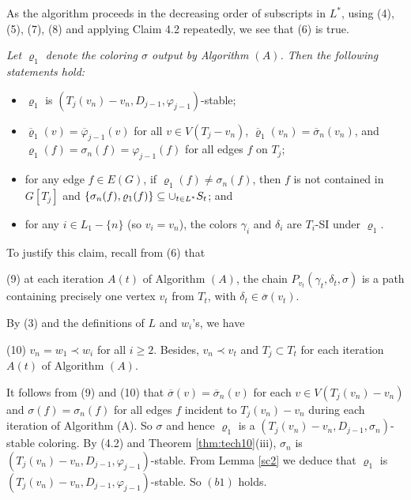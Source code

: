 \documentclass[11pt]{article}
\newcommand{\sigmabar}{\overline{\sigma}}
\newcommand{\phibar}{\overline{\varphi}}
\begin{document}
As the algorithm proceeds in the decreasing order of subscripts in $L^*$, using (4), (5), (7), (8)
and applying Claim 4.2 repeatedly, we see that (6) is true.  

\vskip 3mm
 {\em
Let $\varrho_1$ denote the coloring $\sigma$ output by Algorithm $(A)$.  Then the following statements hold:
\begin{itemize}
	\vspace{-2mm}
	\item[(b1)] $\varrho_1$ is $(T_j(v_n)-v_n,D_{j-1},\varphi_{j-1})$-stable;
	\vspace{-2mm}
	\item[(b2)] $\overline{\varrho}_1 (v)=\phibar_{j-1}(v)$ for all $v\in V(T_j-v_n)$,
	$\overline{\varrho}_1(v_n)=\sigmabar_n(v_n)$, and $\varrho_1(f)=\sigma_n(f) =\varphi_{j-1}(f)$ for all edges $f$ on $T_j$;
	\vspace{-2mm}
	\item[(b3)] for any edge $f\in E(G)$, if $\varrho_1(f)\ne \sigma_n(f)$, then $f$ is not contained in $G[T_j]$ and 
	$\{\sigma_n(f), \varrho_1(f)\} \\ \subseteq \cup_{t \in L^*} S_t$;  and
	\vspace{-2mm}
	\item[(b4)] for any $i\in L_1-\{n\}$ (so $v_i=v_n$), the colors $\gamma_i$ and $\delta_i$ are
	$T_i$-SI under $\varrho_1$. 
\end{itemize}}		

To justify this claim, recall from (6) that 

(9) at each iteration $A(t)$ of Algorithm $(A)$,  the chain $P_{v_t}(\gamma_t, \delta_t, \sigma)$ is a path 
containing precisely one vertex $v_t$ from $T_t$, with $\delta_t \in \overline{\sigma}(v_t)$. 

By (3) and the definitions of $L$ and $w_i$'s, we have

(10) $v_n =w_1 \prec w_i$ for all $i\ge 2$. Besides, $v_n\prec v_t$ and $T_j \subset T_t$ for each iteration $A(t)$ of Algorithm $(A)$.  

It follows from (9) and (10) that $\overline{\sigma}(v) = \overline{\sigma}_n(v)$ for each $v\in V(T_j(v_n)-v_n)$ 
and $\sigma(f) = \sigma_n(f)$ for all edges $f$ incident to $T_j(v_n) - v_n$ during each iteration of Algorithm (A). So $\sigma$
and hence $\varrho_1$ is a $(T_j(v_n) - v_n, D_{j-1}, \sigma_n)$-stable coloring.  By (4.2) and Theorem \ref{thm:tech10}(iii), 
$\sigma_n$ is $(T_j(v_n)-v_n,D_{j-1},\varphi_{j-1})$-stable. From Lemma \ref{sc2} we deduce that $\varrho_1$ is 
$(T_j(v_n)-v_n,D_{j-1},\varphi_{j-1})$-stable. So $(b1)$ holds. 
\end{document}
